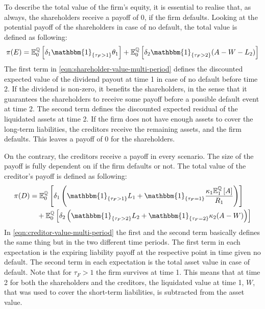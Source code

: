 \documentclass[main.tex]{subfiles}
\begin{document}
        To describe the total value of the firm's equity, it is essential to realise that, as always, the shareholders receive a payoff of 0, if the firm defaults.
        Looking at the potential payoff of the shareholders in case of no default, the total value is defined as following:
        \begin{equation}
            \pi(E)=
            \mathbb{E}_{0}^{\rnmeasure}\left[
                \delta_1\mathbbm{1}_{\{\tau_{F}>1\}} \theta_1
            \right]
            +
            \mathbb{E}_{0}^{\rnmeasure}\left[
                \delta_{2}\mathbbm{1}_{\{\tau_{F}>2\}} (A-W-L_{2})
            \right]
            \label{eqn:shareholder-value-multi-period}
        \end{equation}
        The first term in \cref{eqn:shareholder-value-multi-period} defines the discounted expected value of the dividend payout at time 1 in case of no default before time 2.
        If the dividend is non-zero, it benefits the shareholders,
        in the sense that it guarantees the shareholders to receive some payoff before a possible default event at time 2.
        The second term defines the discounted expected residual of the liquidated assets at time 2.
        If the firm does not have enough assets to cover the long-term liabilities, the creditors receive the remaining assets, and the firm defaults.
        This leaves a payoff of 0 for the shareholders.

        On the contrary, the creditors receive a payoff in every scenario.
        The size of the payoff is fully dependent on if the firm defaults or not.
        The total value of the creditor's payoff is defined as following:
        \begin{align}
            \pi(D)&=
            \mathbb{E}_{0}^{\rnmeasure}\left[
                \delta_1
                \left(\mathbbm{1}_{\{\tau_{F}>1\}} L_1 + \mathbbm{1}_{\{\tau_{F}=1\}} 
                \frac{
                    \kappa_1 \mathbb{E}_{1}^{\rnmeasure}\left[A\right]
                }{
                    R_1
                }
                \right)
            \right]
            \nonumber
            \\
            &\quad+
            \mathbb{E}_{0}^{\rnmeasure}\left[
                \delta_{2}
                \left(\mathbbm{1}_{\{\tau_{F}>2\}}L_{2}
                +
                \mathbbm{1}_{\{\tau_{F}=2\}}\kappa_{2}(A-W)
                \right)
            \right]
            \label{eqn:creditor-value-multi-period}
        \end{align}
        In \cref{eqn:creditor-value-multi-period} the first and the second term basically defines the same thing but in the two different time periods.
        The first term in each expectation is the expiring liability payoff at the respective point in time given no default.
        The second term in each expectation is the total asset value in case of default.
        Note that for $\tau_{F}>1$ the firm survives at time 1.
        This means that at time 2 for both the shareholders and the creditors, the liquidated value at time 1, $W$,
        that was used to cover the short-term liabilities, is subtracted from the asset value.
\end{document}
